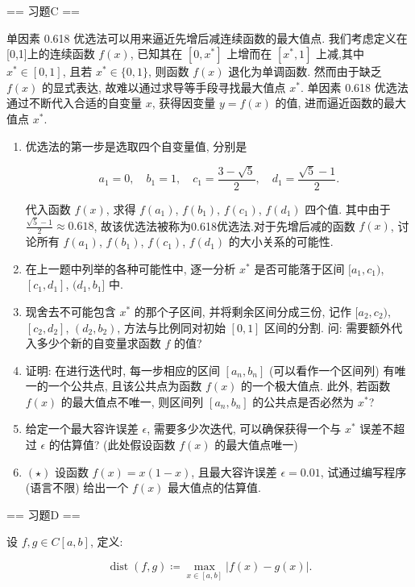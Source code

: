 == 习题C ==

单因素 0.618 优选法可以用来逼近先增后减连续函数的最大值点. 我们考虑定义在[0,1]上的连续函数 $f(x)$,
已知其在 $[0,x^{*}]$ 上增而在 $[x^{*},1]$ 上减,其中 $x^{*}\in [0,1]$, 且若 $x^{*}\in \{0,1\}$, 
则函数 $f(x)$ 退化为单调函数. 然而由于缺乏 $f(x)$ 的显式表达, 故难以通过求导等手段寻找最大值点 $x^{*}$.
单因素 0.618 优选法通过不断代入合适的自变量 $x$, 获得因变量 $y = f(x)$ 的值, 进而逼近函数的最大值点 $x^{*}$.

\begin{enumerate}
    \item[1.]优选法的第一步是选取四个自变量值, 分别是

    \[\displaystyle a_{1} = 0,\quad b_{1} = 1,\quad c_{1} = \frac{3 - \sqrt{5}}{2},\quad d_{1} = \frac{\sqrt{5} - 1}{2}.\]

    代入函数 $f(x)$, 求得 $f(a_{1})$, $f(b_{1})$, $f(c_{1})$, $f(d_{1})$ 四个值.
    其中由于 $\displaystyle\frac{\sqrt{5} - 1}{2} \approx 0.618$, 故该优选法被称为0.618优选法.对于先增后减的函数 $f(x)$,
    讨论所有 $f(a_{1})$, $f(b_{1})$, $f(c_{1})$, $f(d_{1})$ 的大小关系的可能性.
    \item[2.]在上一题中列举的各种可能性中, 逐一分析 $x^*$ 是否可能落于区间 $[a_1, c_1)$, $[c_1, d_1]$, $(d_1, b_1]$ 中.
    \item[3.]现舍去不可能包含 $x^*$ 的那个子区间, 并将剩余区间分成三份, 记作 $[a_2, c_2)$, $[c_2, d_2]$, $(d_2, b_2)$, 
    方法与比例同对初始 $[0, 1]$ 区间的分割. 问: 需要额外代入多少个新的自变量求函数 $f$ 的值?
    \item[4.]证明: 在进行迭代时, 每一步相应的区间 $[a_n, b_n]$ (可以看作一个区间列) 有唯一的一个公共点, 且该公共点为函数 $f(x)$ 的一个极大值点. 
    此外, 若函数 $f(x)$ 的最大值点不唯一, 则区间列 $[a_n, b_n]$ 的公共点是否必然为 $x^*$?
    \item[5.]给定一个最大容许误差 $\epsilon$, 需要多少次迭代, 可以确保获得一个与 $x^*$ 误差不超过 $\epsilon$ 的估算值? 
    (此处假设函数 $f(x)$ 的最大值点唯一)
    \item[6.]$(\star)$ 设函数 $f(x) = x(1 - x)$, 且最大容许误差 $\epsilon = 0.01$, 试通过编写程序 (语言不限) 给出一个 $f(x)$ 最大值点的估算值.
\end{enumerate}

== 习题D ==

设 $\displaystyle f, g \in C[a, b]$, 定义:

\[\displaystyle\operatorname {dist}(f, g) \coloneqq \max_{x \in [a, b]} |f(x) - g(x)|.\]

